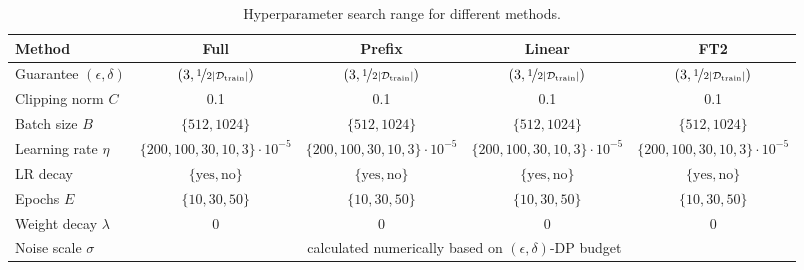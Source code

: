 \begin{table}[H]
    \centering
    \footnotesize
    \setlength{\tabcolsep}{0.7pt}
    \renewcommand{\arraystretch}{1.2}
    \caption{Hyperparameter search range for different methods.}
    \begin{tabular}{@{} l c c c c @{}}
        \toprule
        Method & Full & Prefix & Linear & FT2\\
        \midrule
        Guarantee $(\epsilon, \delta)$ &
        $(3, \nicefrac{1}{2|\mathcal{D}_{\text{train}}|})$ & 
        $(3, \nicefrac{1}{2|\mathcal{D}_{\text{train}}|})$ & 
        $(3, \nicefrac{1}{2|\mathcal{D}_{\text{train}}|})$ & 
        $(3, \nicefrac{1}{2|\mathcal{D}_{\text{train}}|})$ \\
        Clipping norm $C$ &0.1 & 0.1 & 0.1 & 0.1\\
        Batch size $B$ 
        &$\{512, 1024\}$ 
        &$\{512, 1024\}$ 
        &$\{512, 1024\}$
        &$\{512, 1024\}$\\
        Learning rate $\eta$
        & \tiny $ \{200, 100, 30, 10, 3\} \cdot 10^{-5}$
        & \tiny $\{200, 100, 30, 10, 3\} \cdot 10^{-5}$
        & \tiny $\{200, 100, 30, 10, 3\} \cdot 10^{-5}$
        & \tiny $\{200, 100, 30, 10, 3\} \cdot 10^{-5}$ \\
        LR decay
        & $\{ \text{yes}, \text{no}\}$ 
        & $\{ \text{yes}, \text{no}\}$ 
        & $\{ \text{yes}, \text{no}\}$ 
        & $\{ \text{yes}, \text{no}\}$ \\
        Epochs $E$
        &$\{10, 30, 50\}$
        & $\{10, 30, 50\}$
        & $\{10, 30, 50\}$
        & $\{10, 30, 50\}$ \\
        Weight decay $\lambda$ & 0 & 0 & 0 & 0 \\
        Noise scale $\sigma$ 
        & \multicolumn{4}{c}{calculated numerically based on $(\epsilon, \delta)$-DP budget} \\
        \bottomrule
        \end{tabular}
        \label{tab:hparams}
\end{table}

